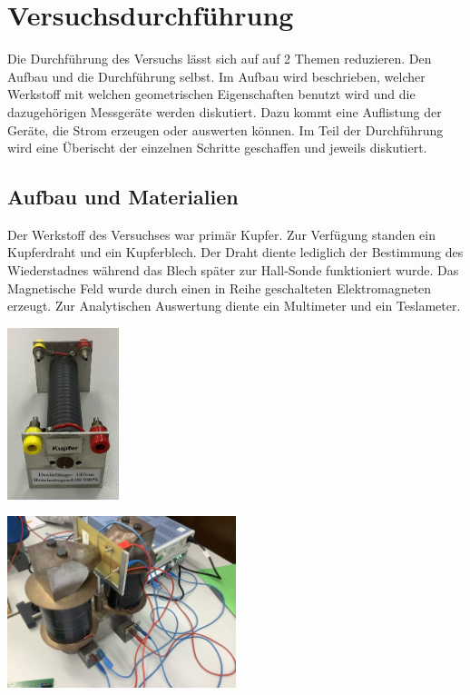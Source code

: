 \section{Versuchsdurchführung} 
\label{sec:versuchdurchführung}
Die Durchführung des Versuchs lässt sich auf auf 2 Themen reduzieren. Den Aufbau %
und die Durchführung %
selbst. Im Aufbau wird beschrieben, 
welcher Werkstoff mit welchen geometrischen Eigenschaften benutzt wird und die dazugehörigen Messgeräte werden diskutiert. Dazu kommt eine Auflistung der Geräte, die Strom erzeugen oder 
auswerten können. Im Teil der Durchführung %
wird eine Überischt der einzelnen Schritte geschaffen und jeweils diskutiert.


\subsection{Aufbau und Materialien}
\label{sec:Aufbau}
Der Werkstoff des Versuchses war primär Kupfer. Zur Verfügung standen ein Kupferdraht und ein Kupferblech. Der Draht diente lediglich der Bestimmung des Wiederstadnes während 
das Blech später zur Hall-Sonde funktioniert wurde. 
Das Magnetische Feld wurde durch einen in Reihe geschalteten Elektromagneten erzeugt. Zur Analytischen Auswertung diente ein Multimeter und ein Teslameter.\\
 
\vspace{1cm}
\begin{minipage}{0.5\textwidth}
\centering
\includegraphics[height=5cm]{bilder/Kupferdraht.png}
\label{fig:Kupferdraht}
\end{minipage}
\hfill
\begin{minipage}{0.49\textwidth} 
\centering
\includegraphics[height=5cm]{bilder/Magnet.png}
\label{fig:Magnet}
\end{minipage}

